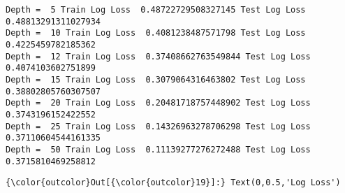 \documentclass[11pt]{article}
\begin{document}
    \begin{Verbatim}[commandchars=\\\{\}]
Depth =  5 Train Log Loss  0.48722729508327145 Test Log Loss  0.48813291311027934
Depth =  10 Train Log Loss  0.4081238487571798 Test Log Loss  0.4225459782185362
Depth =  12 Train Log Loss  0.37408662763549844 Test Log Loss  0.4074103602751899
Depth =  15 Train Log Loss  0.3079064316463802 Test Log Loss  0.38802805760307507
Depth =  20 Train Log Loss  0.20481718757448902 Test Log Loss  0.3743196152422552
Depth =  25 Train Log Loss  0.14326963278706298 Test Log Loss  0.37110604544161335
Depth =  50 Train Log Loss  0.11139277276272488 Test Log Loss  0.3715810469258812

    \end{Verbatim}

\begin{Verbatim}[commandchars=\\\{\}]
{\color{outcolor}Out[{\color{outcolor}19}]:} Text(0,0.5,'Log Loss')
\end{Verbatim}
            
    \begin{center}
    \end{center}
    { \hspace*{\fill} \\}
    
\end{document}
